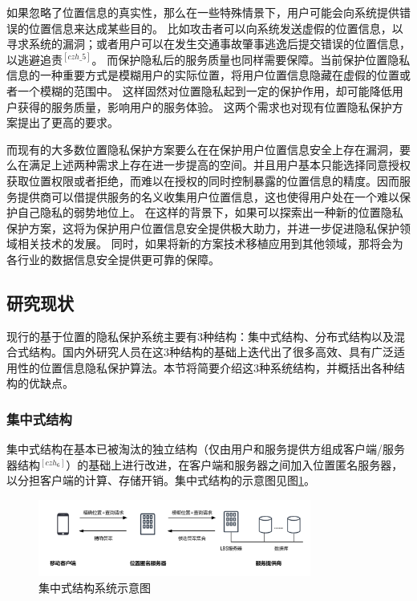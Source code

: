 \documentclass[zihao=-4]{ctexart}
\begin{document}
如果忽略了位置信息的真实性，那么在一些特殊情景下，用户可能会向系统提供错误的位置信息来达成某些目的。
比如攻击者可以向系统发送虚假的位置信息，以寻求系统的漏洞；或者用户可以在发生交通事故肇事逃逸后提交错误的位置信息，以逃避追责$^{[czh\_5]}$。
而保护隐私后的服务质量也同样需要保障。当前保护位置隐私信息的一种重要方式是模糊用户的实际位置，将用户位置信息隐藏在虚假的位置或者一个模糊的范围中。
这样固然对位置隐私起到一定的保护作用，却可能降低用户获得的服务质量，影响用户的服务体验。
这两个需求也对现有位置隐私保护方案提出了更高的要求。
\par
而现有的大多数位置隐私保护方案要么在在保护用户位置信息安全上存在漏洞，要么在满足上述两种需求上存在进一步提高的空间。并且用户基本只能选择同意授权获取位置权限或者拒绝，而难以在授权的同时控制暴露的位置信息的精度。因而服务提供商可以借提供服务的名义收集用户位置信息，这也使得用户处在一个难以保护自己隐私的弱势地位上。
在这样的背景下，如果可以探索出一种新的位置隐私保护方案，这将为保护用户位置信息安全提供极大助力，并进一步促进隐私保护领域相关技术的发展。
同时，如果将新的方案技术移植应用到其他领域，那将会为各行业的数据信息安全提供更可靠的保障。


\subsection{研究现状}

现行的基于位置的隐私保护系统主要有3种结构：集中式结构、分布式结构以及混合式结构。国内外研究人员在这3种结构的基础上迭代出了很多高效、具有广泛适用性的位置信息隐私保护算法。本节将简要介绍这3种系统结构，并概括出各种结构的优缺点。

\subsubsection{集中式结构}
集中式结构在基本已被淘汰的独立结构（仅由用户和服务提供方组成客户端/服务器结构$^{[czh_6]}$）的基础上进行改进，在客户端和服务器之间加入位置匿名服务器，以分担客户端的计算、存储开销。集中式结构的示意图见图\ref{集中式结构}。

\begin{figure}[H] %
	\centering %
	\includegraphics[width=0.8\textwidth]{./include_picture/集中式结构（绪论-研究现状）} %
	\caption{集中式结构系统示意图} %
	\label{集中式结构} %
\end{figure}
\end{document}
